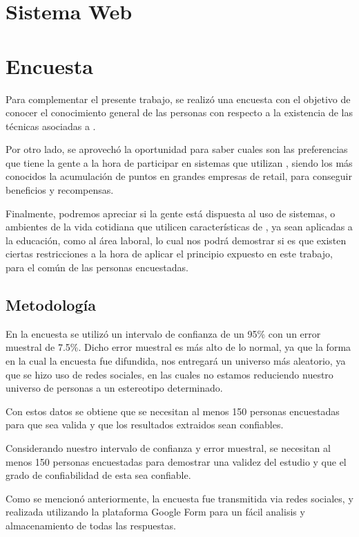\section{Sistema Web}



\section{Encuesta}

Para complementar el presente trabajo, se realizó una encuesta con el objetivo de
conocer el conocimiento general de las personas con respecto a la existencia
de las técnicas asociadas a {\GAM}.

Por otro lado, se aprovechó la oportunidad para saber cuales son las preferencias
que tiene la gente a la hora de participar en sistemas que utilizan {\GAM},
siendo los más conocidos la acumulación de puntos en grandes empresas de retail,
para conseguir beneficios y recompensas.

Finalmente, podremos apreciar si la gente está dispuesta al uso de sistemas,
o ambientes de la vida cotidiana que utilicen características de {\GAM},
ya sean aplicadas a la educación, como al área laboral, lo cual nos podrá
demostrar si es que existen ciertas restricciones a la hora de aplicar
el principio expuesto en este trabajo, para el común de las personas
encuestadas.

\subsection{Metodología}

En la encuesta se utilizó un intervalo de confianza de un 95\% con un error
muestral de 7.5\%.
Dicho error muestral es más alto de lo normal, ya que la forma en la cual la encuesta
fue difundida, nos entregará un universo más aleatorio, ya que se hizo uso de redes
sociales, en las cuales no estamos reduciendo nuestro universo de personas
a un estereotipo determinado.


Con estos datos se obtiene que se necesitan al menos 150 personas encuestadas para que sea valida y
que los resultados extraidos sean confiables. 

Considerando nuestro intervalo de confianza y error muestral,
se necesitan al menos 150 personas encuestadas para demostrar
una validez del estudio y que el grado de confiabilidad de esta
sea confiable.

Como se mencionó anteriormente, la encuesta fue transmitida via redes sociales,
y realizada utilizando la plataforma Google Form para un fácil analisis y
almacenamiento de todas las respuestas.

